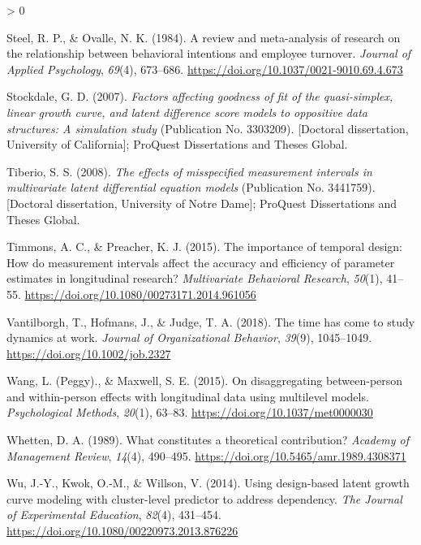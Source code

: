 \documentclass[
12pt, %
twoside,
english]{guelphthesis}
\newlength{\cslhangindent}
\newenvironment{CSLReferences}[2] %
 {%
  \setlength{\parindent}{0pt}
  \ifodd #1 \everypar{\setlength{\hangindent}{\cslhangindent}}\ignorespaces\fi
  \ifnum #2 > 0
  \setlength{\parskip}{\linespacing{2}}
  \fi
 }%
 {}
\begin{document}
\begin{CSLReferences}{1}{0}
\leavevmode{}%
Steel, R. P., \& Ovalle, N. K. (1984). A review and meta-analysis of research on the relationship between behavioral intentions and employee turnover. \emph{Journal of Applied Psychology}, \emph{69}(4), 673--686. \url{https://doi.org/10.1037/0021-9010.69.4.673}

\leavevmode{}%
Stockdale, G. D. (2007). \emph{Factors affecting goodness of fit of the quasi-simplex, linear growth curve, and latent difference score models to oppositive data structures: A simulation study} (Publication No. 3303209). {[}Doctoral dissertation, University of California{]}; {ProQuest Dissertations and Theses Global.}

\leavevmode{}%
Tiberio, S. S. (2008). \emph{The effects of misspecified measurement intervals in multivariate latent differential equation models} (Publication No. 3441759). {[}Doctoral dissertation, University of Notre Dame{]}; {ProQuest Dissertations and Theses Global.}

\leavevmode{}%
Timmons, A. C., \& Preacher, K. J. (2015). The importance of temporal design: How do measurement intervals affect the accuracy and efficiency of parameter estimates in longitudinal research? \emph{Multivariate Behavioral Research}, \emph{50}(1), 41--55. \url{https://doi.org/10.1080/00273171.2014.961056}

\leavevmode{}%
Vantilborgh, T., Hofmans, J., \& Judge, T. A. (2018). The time has come to study dynamics at work. \emph{Journal of Organizational Behavior}, \emph{39}(9), 1045--1049. \url{https://doi.org/10.1002/job.2327}

\leavevmode{}%
Wang, L. (Peggy)., \& Maxwell, S. E. (2015). On disaggregating between-person and within-person effects with longitudinal data using multilevel models. \emph{Psychological Methods}, \emph{20}(1), 63--83. \url{https://doi.org/10.1037/met0000030}

\leavevmode{}%
Whetten, D. A. (1989). What constitutes a theoretical contribution? \emph{Academy of Management Review}, \emph{14}(4), 490--495. \url{https://doi.org/10.5465/amr.1989.4308371}

\leavevmode{}%
Wu, J.-Y., Kwok, O.-M., \& Willson, V. (2014). Using design-based latent growth curve modeling with cluster-level predictor to address dependency. \emph{The Journal of Experimental Education}, \emph{82}(4), 431--454. \url{https://doi.org/10.1080/00220973.2013.876226}


\end{CSLReferences}
\end{document}
